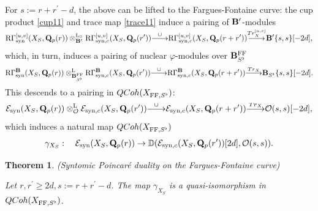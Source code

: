\documentclass[10pt,reqno]{amsart}
\newtheorem{theorem}[equation]{Theorem}
\theoremstyle{definition}
\theoremstyle{remark}
\def\lomapr#1{\smash{\mathop{\relbar\joinrel\longrightarrow}\limits^{#1}}}
\def\phi{\varphi}
\newcommand{\synt}{ \operatorname{syn} }
\newcommand{\LL}{\operatorname{L} }
\newcommand{\FF}{\operatorname{FF} }
\newcommand{\so}{{\mathcal O}}
\newcommand{\se}{{\mathcal{E}}}
\numberwithin{equation}{section}
\def\R{{\mathrm R}}
\def\Q{{\bf Q}} \def\Z{{\bf Z}}
\numberwithin{equation}{section}
\begin{document}
 For  $ s:=r+r^{\prime}-d$, the above can be lifted to the Fargues-Fontaine curve: the cup product \eqref{cup11} and trace map \eqref{trace11}  induce a pairing of ${\bf B}^{\prime}$-modules
 $$
 \R\Gamma^{{[u,v]}}_{\synt}(X_S,\Q_p(r))\otimes^{\LL_{\Box}}_{\B^{\prime}}\R\Gamma^{{[u,v]}}_{\synt,c}(X_S,\Q_p(r^{\prime}))\lomapr{\cup}\R\Gamma^{{[u,v]}}_{\synt,c}(X_S,\Q_p(r+r^{\prime})) \lomapr{{\rm Tr}^{[u,v]}_X} \B^{\prime}\{s,s\}[-2d], 
 $$
 which, in turn, induces a pairing of nuclear $\phi$-modules over $\B^{\FF}_{S^{\flat}}$
 $$
  \R\Gamma^{\B}_{\synt}(X_S,\Q_p(r))\otimes^{\LL}_{\B^{\FF}_{S^{\flat}}}\R\Gamma^{\B}_{\synt,c}(X_S,\Q_p(r^{\prime}))\lomapr{\cup} \R\Gamma^{\B}_{\synt,c}(X_S,\Q_p(r+r^{\prime}))\lomapr{{\rm Tr}_X}\B_{S^{\flat}}\{s,s\}[-2d].
 $$
 This descends to a pairing  in ${\rm QCoh}(X_{\FF,S^{\flat}})$:
$$
\se_{\synt}(X_S,\Q_p(r))\otimes^{\LL}_{\so}\se_{\synt,c}(X_S,\Q_p(r^{\prime}))\lomapr{\cup} \se_{\synt,c}(X_S,\Q_p(r+r^{\prime}))\lomapr{{\rm Tr}_X}\so(s,s)[-2d],
$$
which induces a natural map ${\rm QCoh}(X_{\FF,S^{\flat}})$
\begin{equation}\label{niedziela10}
\gamma_{X_S}:\quad  \se_{\synt}(X_S,\Q_p(r))\to  {\mathbb D}(\se_{\synt,c}(X_S,\Q_p(r^{\prime}))[2d],\so(s,s)).
\end{equation}
\begin{theorem}{\rm (Syntomic Poincar\'e duality on the Fargues-Fontaine curve)}\label{curve-duality} 

Let $r,r^{\prime}\geq 2d, s:=r+r^{\prime}-d$. 
The map $\gamma_{X_S}$ is a quasi-isomorphism in ${\rm QCoh}(X_{\FF,S^{\flat}})$. 
\end{theorem}
\end{document}
